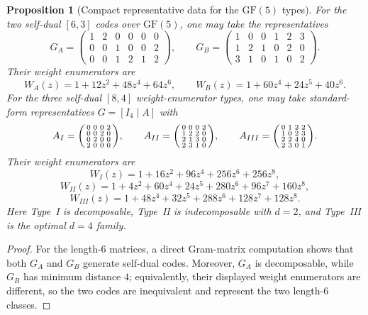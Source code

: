 \documentclass[12pt]{article}
\newtheorem{prop}[theorem]{Proposition}
\newcommand{\GF}[1]{\ensuremath{\mathrm{GF}(#1)}}
\newenvironment{blueblock}{\begingroup\color{blue}}{\endgroup}
\begin{document}
\begin{blueblock}
\begin{prop}[Compact representative data for the $\GF{5}$ types]
\label{prop:gf5-representatives}
For the two self-dual $[6,3]$ codes over $\GF{5}$, one may take the representatives
\[
G_A=
\begin{pmatrix}
1 & 2 & 0 & 0 & 0 & 0\\
0 & 0 & 1 & 0 & 0 & 2\\
0 & 0 & 1 & 2 & 1 & 2
\end{pmatrix},
\qquad
G_B=
\begin{pmatrix}
1 & 0 & 0 & 1 & 2 & 3 \\
1 & 2 & 1 & 0 & 2 & 0 \\
3 & 1 & 0 & 1 & 0 & 2
\end{pmatrix}.
\]
Their weight enumerators are
\[
W_A(z)=1+12z^2+48z^4+64z^6,
\qquad
W_B(z)=1+60z^4+24z^5+40z^6.
\]
For the three self-dual $[8,4]$ weight-enumerator types, one may take standard-form representatives $G=[I_4\mid A]$ with
\[
A_I =
\begin{psmallmatrix}
0&0&0&2\\
0&0&2&0\\
0&2&0&0\\
2&0&0&0
\end{psmallmatrix},
\qquad
A_{II} =
\begin{psmallmatrix}
0&0&0&2\\
1&2&2&0\\
2&1&3&0\\
2&3&1&0
\end{psmallmatrix},
\qquad
A_{III} =
\begin{psmallmatrix}
0&1&2&2\\
1&0&2&3\\
2&2&4&0\\
2&3&0&1
\end{psmallmatrix}.
\]
Their weight enumerators are
\[
W_I(z)=1+16z^2+96z^4+256z^6+256z^8,
\]
\[
W_{II}(z)=1+4z^2+60z^4+24z^5+280z^6+96z^7+160z^8,
\]
\[
W_{III}(z)=1+48z^4+32z^5+288z^6+128z^7+128z^8.
\]
Here Type~I is decomposable, Type~II is indecomposable with $d=2$, and Type~III is the optimal $d=4$ family.
\end{prop}

\begin{proof}
For the length-$6$ matrices, a direct Gram-matrix computation shows that both $G_A$ and $G_B$ generate self-dual codes. Moreover, $G_A$ is decomposable, while $G_B$ has minimum distance $4$; equivalently, their displayed weight enumerators are different, so the two codes are inequivalent and represent the two length-$6$ classes.


\end{proof}
\end{blueblock}
\end{document}
